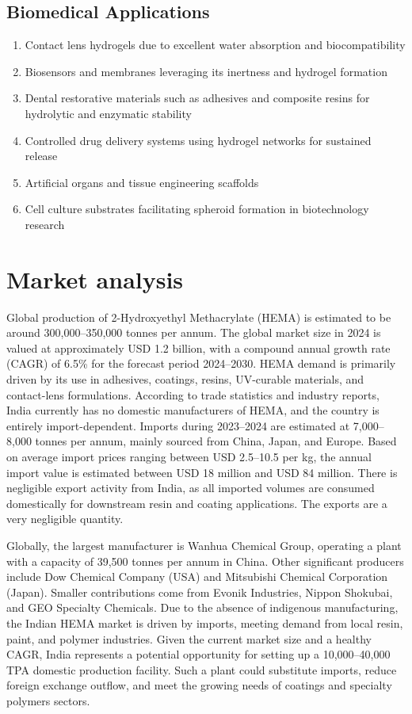 \documentclass[12pt,a4paper]{report}
\begin{document}
\subsection{Biomedical Applications}
	\begin{enumerate}
		\item {Contact lens hydrogels due to excellent water absorption and biocompatibility}
		\item {Biosensors and membranes leveraging its inertness and hydrogel formation}
		\item {Dental restorative materials such as adhesives and composite resins for hydrolytic and enzymatic stability}
		\item {Controlled drug delivery systems using hydrogel networks for sustained release}
		\item {Artificial organs and tissue engineering scaffolds}
		\item {Cell culture substrates facilitating spheroid formation in biotechnology research
		}
	\end{enumerate}	
	
	
\section{Market analysis}
Global production of 2-Hydroxyethyl Methacrylate (HEMA) is estimated to be around 300,000–350,000 tonnes per annum. The global market size in 2024 is valued at approximately USD 1.2 billion, with a compound annual growth rate (CAGR) of 6.5\% for the forecast period 2024–2030. HEMA demand is primarily driven by its use in adhesives, coatings, resins, UV-curable materials, and contact-lens formulations.
According to trade statistics and industry reports, India currently has no domestic manufacturers of HEMA, and the country is entirely import-dependent. Imports during 2023–2024 are estimated at 7,000–8,000 tonnes per annum, mainly sourced from China, Japan, and Europe. Based on average import prices ranging between USD 2.5–10.5 per kg, the annual import value is estimated between USD 18 million and USD 84 million. There is negligible export activity from India, as all imported volumes are consumed domestically for downstream resin and coating applications. The exports are a very negligible quantity.

Globally, the largest manufacturer is Wanhua Chemical Group, operating a plant with a capacity of 39,500 tonnes per annum in China. Other significant producers include Dow Chemical Company (USA) and Mitsubishi Chemical Corporation (Japan). Smaller contributions come from Evonik Industries, Nippon Shokubai, and GEO Specialty Chemicals.
Due to the absence of indigenous manufacturing, the Indian HEMA market is driven by imports, meeting demand from local resin, paint, and polymer industries. Given the current market size and a healthy CAGR, India represents a potential opportunity for setting up a 10,000–40,000 TPA domestic production facility. Such a plant could substitute imports, reduce foreign exchange outflow, and meet the growing needs of coatings and specialty polymers sectors.
\end{document}
